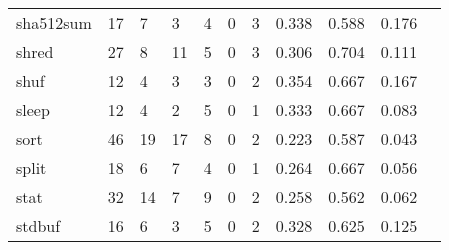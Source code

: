 \begin{longtable}{lp{1.10cm}p{1.10cm}p{1.10cm}p{1.10cm}p{1.10cm}p{1.10cm}p{1.10cm}p{1.10cm}p{1.10cm}p{1.10cm}}
sha512sum &                     17 &                                  7 &                                 3 &                                4 &                                 0 &                               3 &                          0.338 &                                 0.588 &                               0.176 \\
shred     &                     27 &                                  8 &                                11 &                                5 &                                 0 &                               3 &                          0.306 &                                 0.704 &                               0.111 \\
shuf      &                     12 &                                  4 &                                 3 &                                3 &                                 0 &                               2 &                          0.354 &                                 0.667 &                               0.167 \\
sleep     &                     12 &                                  4 &                                 2 &                                5 &                                 0 &                               1 &                          0.333 &                                 0.667 &                               0.083 \\
sort      &                     46 &                                 19 &                                17 &                                8 &                                 0 &                               2 &                          0.223 &                                 0.587 &                               0.043 \\
split     &                     18 &                                  6 &                                 7 &                                4 &                                 0 &                               1 &                          0.264 &                                 0.667 &                               0.056 \\
stat      &                     32 &                                 14 &                                 7 &                                9 &                                 0 &                               2 &                          0.258 &                                 0.562 &                               0.062 \\
stdbuf    &                     16 &                                  6 &                                 3 &                                5 &                                 0 &                               2 &                          0.328 &                                 0.625 &                               0.125 \\

\end{longtable}
